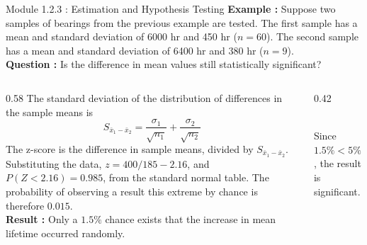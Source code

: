 \documentclass{beamer}
\begin{document}
\begin{frame}{Module 1.2.3 : Estimation and Hypothesis Testing}
\scriptsize
\textbf{Example :} Suppose two samples of bearings from the previous example are tested.  The first sample has a mean and standard deviation of 6000 hr and 450 hr ($n=60$). The second sample has a mean and standard deviation of 6400 hr and 380 hr ($n=9$). \\ \vspace{0.25cm}
\textbf{Question :} Is the difference in mean values still statistically significant?
\vspace{0.25cm}
\begin{columns}[T]
\begin{column}{0.58\textwidth}
\scriptsize
The standard deviation of the distribution of differences in the sample means is 
\begin{equation}
S_{\bar{x}_1 - \bar{x}_2} = \frac{\sigma_1}{\sqrt{n_1}}+\frac{\sigma_2}{\sqrt{n_2}}
\end{equation}
The z-score is the difference in sample means, divided by $S_{\bar{x}_1 - \bar{x}_2}$.  Substituting the data, $z = 400/185 - 2.16$, and $P(Z<2.16)=0.985$, from the standard normal table. The probability of observing a result this extreme by chance is therefore $0.015$. \\ \vspace{0.25cm}
\textbf{Result :} Only a $1.5\%$ chance exists that the increase in mean lifetime occurred randomly.
\end{column}
\begin{column}{0.42\textwidth}
 \\
\scriptsize
Since $1.5\% < 5\%$, the result is significant.
\end{column}
\end{columns}
\end{frame}
\end{document}
